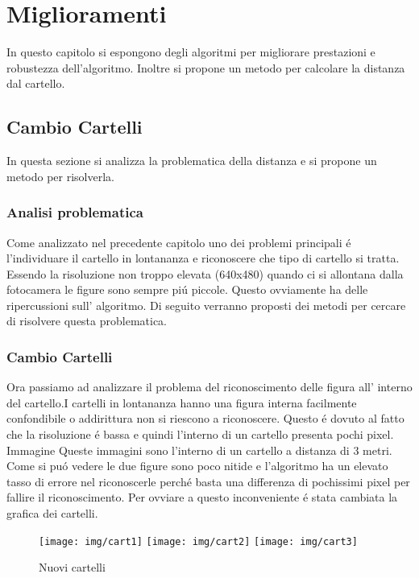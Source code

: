 \chapter{Miglioramenti}

In questo capitolo si espongono degli algoritmi per migliorare prestazioni e robustezza dell'algoritmo. Inoltre si propone un metodo per calcolare la distanza dal cartello.

\section{Cambio Cartelli}

	In questa sezione si analizza la problematica della distanza e si propone un metodo per risolverla.

	\subsection{Analisi problematica}
		Come analizzato nel precedente capitolo uno dei problemi principali \'e l'individuare il cartello in lontananza e riconoscere che tipo di cartello si tratta.
		Essendo la risoluzione non troppo elevata (640x480) quando ci si allontana dalla fotocamera le figure sono sempre pi\'u piccole. Questo ovviamente ha delle ripercussioni sull' algoritmo.
		Di seguito verranno proposti dei metodi per cercare di risolvere questa problematica.


	\subsection{Cambio Cartelli}
		Ora passiamo ad analizzare il problema del riconoscimento delle figura all' interno del cartello.\newline I cartelli in lontananza hanno una figura interna facilmente confondibile o addirittura non si riescono a riconoscere. Questo \'e dovuto al fatto che la risoluzione \'e bassa e quindi l'interno di un cartello presenta pochi pixel.
		Immagine
		Queste immagini sono l'interno di un cartello a distanza di 3 metri. Come si pu\'o vedere le due figure sono poco nitide e l'algoritmo ha un elevato tasso di errore nel riconoscerle perch\'e basta una differenza di pochissimi pixel per fallire il riconoscimento.
		Per ovviare a questo inconveniente \'e stata cambiata la grafica dei cartelli.
		\begin{figure}[!ht]
			\centering
			\texttt{[image: img/cart1]}
			\texttt{[image: img/cart2]}
			\texttt{[image: img/cart3]}
			\caption{Nuovi cartelli}
		\end{figure}

